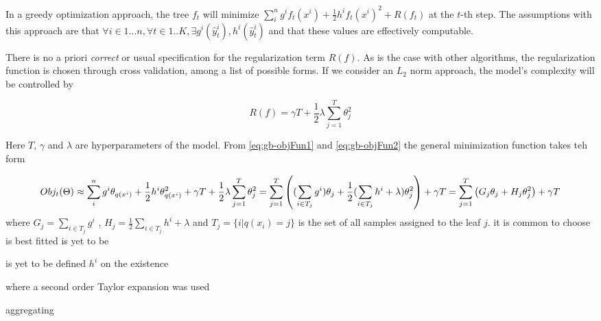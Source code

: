 In a greedy optimization approach, the tree $f_t$ will minimize $\sum_i^n {  g^i f_t(x^i) + \frac{1}{2} h^i f_t(x^i)^2 } + R(f_t)$ at the $t$-th step. The assumptions with this approach are that $ \forall i \in {1...n}, \forall t \in {1..K}, \exists g^i(\hat{y}_{t}^i), h^i(\hat{y}_{t}^i) $ and that these values are effectively computable.

There is no a priori \textit{correct} or usual specification for the regularization term $R(f)$. As is the case with other algorithms, the regularization function is chosen through cross validation, among a list of possible forms. If we consider an $L_2$ norm approach, the model's complexity will be controlled by 

\begin{equation} \label{eq:gb-objFun2}
R(f) =  \gamma T + \frac{1}{2}\lambda \sum_{j=1}^T\theta_j^2 
\end{equation}

Here $T$, $\gamma$ and $\lambda$ are hyperparameters of the model. From \ref{eq:gb-objFun1} and \ref{eq:gb-objFun2} the general minimization function takes teh form

\begin{equation} \label{eq:gb-objFun}

    Obj_t(\Theta) \approx  \sum_i^n {g^i \theta_{q(x^i)} + \frac{1}{2} h^i \theta_{q(x^i)}^2 } + \gamma T 
        + \frac{1}{2}\lambda \sum_{j=1}^T\theta_j^2 \\
          =   \sum_{j=1}^T\left(  (\sum_{i \in T_j} g^i )\theta_{j} + \frac{1}{2} (\sum_{i \in T_j} h^i + \lambda ) \theta_{j}^2  \right) + \gamma T \\
         =   \sum_{j=1}^T\left(  G_j \theta_{j} + H_j \theta_{j}^2  \right) + \gamma T \\
         
\end{equation}
where $G_j = \sum_{i \in T_j} g^i $ ,  $H_j = \frac{1}{2} \sum_{i \in T_j} h^i + \lambda$ and $T_j = \{i | q(x_i)= j \}$ is the set of all samples assigned to the leaf $j$. 
it is common to choose is best fitted
is yet to be 

is  yet to be defined
$h^i$ on the existence 

where a second order Taylor expansion was used 

aggregating 








